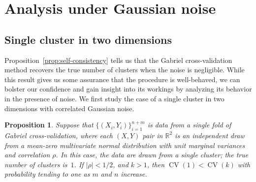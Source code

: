\documentclass[12pt]{article}
\newtheorem{proposition}{Proposition}
\newcommand{\CV}{\operatorname{CV}}
\newcommand{\R}{\mathbb{R}}
\begin{document}
\section{Analysis under Gaussian noise}
\label{sec:theory-gaussian}

\subsection{Single cluster in two dimensions}

Proposition~\ref{prop:self-consistency} tells us that the Gabriel cross-validation
method recovers the true number of clusters when the noise is negligible.
While this result gives us some assurance that the procedure is well-behaved,
we can bolster our confidence and gain insight into its workings by analyzing
its behavior in the presence of noise.  We first study the case of a single
cluster in two dimensions with correlated Gaussian noise.

\begin{proposition}\label{prop:single-2d}
Suppose that $\{ (X_i, Y_i) \}_{i=1}^{n + m}$ is data from a single fold
of Gabriel cross-validation, where each $(X,Y)$ pair in $\R^2$ is an
independent draw from a mean-zero multivariate normal distribution with unit
marginal variances and correlation $\rho$.  In this case, the data are drawn
from a single cluster; the true number of clusters is~$1$.  If $|\rho| < 1/2$,
and $k > 1$, then $\CV(1) < \CV(k)$ with probability tending to one as $m$
and $n$ increase.
\end{proposition}
\end{document}
